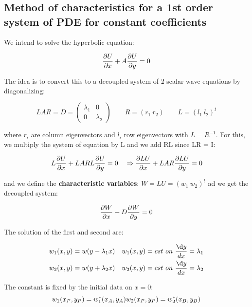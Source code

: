\subsection{Method of characteristics for a 1st order system of PDE for constant coefficients}
	We intend to solve the hyperbolic equation: 
	
	\begin{equation}
	\frac{\D U}{\D x} + A \frac{\D U}{\D y} = 0
	\end{equation}
	
	The idea is to convert this to a decoupled system of 2 scalar wave equations by diagonalizing: 
	
	\begin{equation}
	LAR = D = \left( 
	\begin{array}{cc}
	\lambda _1 & 0\\
	0 & \lambda _2
	\end{array}
	\right) \qquad R = (r_1 \ r_2) \qquad L = (l_1 \ l_2) ^t
	\end{equation}
	
	where $r_i$ are column eigenvectors and $l_i$ row eigenvectors with $L = R^{-1}$. For this, we multiply the system of equation by L and we add RL since LR = I: 
	
	\begin{equation}
	L\frac{\D U}{\D x} + LARL \frac{\D U}{\D y} = 0 \quad \Rightarrow 	\frac{\D LU}{\D x} + LAR \frac{\D LU}{\D y} = 0
	\end{equation}
	
	and we define the \textbf{characteristic variables}: $W = LU = (w_1 \ w_2)^t$ ad we get the decoupled system: 
	
	\begin{equation}
	\frac{\D W}{\D x} + D \frac{\D W}{\D y} = 0
	\end{equation}
	
	The solution of the first and second are: 
	
	\begin{equation}
	\begin{aligned}
	w_1(x,y) = w(y- \lambda _1 x) \quad w_1(x,y) = cst \ on \ \frac{\d y}{dx} = \lambda _1\\
	w_2(x,y) = w(y+ \lambda _2 x) \quad w_2(x,y) = cst \ on \ \frac{\d y}{dx} = \lambda _2
	\end{aligned}
	\end{equation}
	
	The constant is fixed by the initial data on $x=0$: 
	\begin{equation}
	w_1(x_P, y_P) = w_1^* (x_A, y_A)\\
	w_2(x_P, y_P) = w_2^* (x_B, y_B)
	\end{equation}
	
